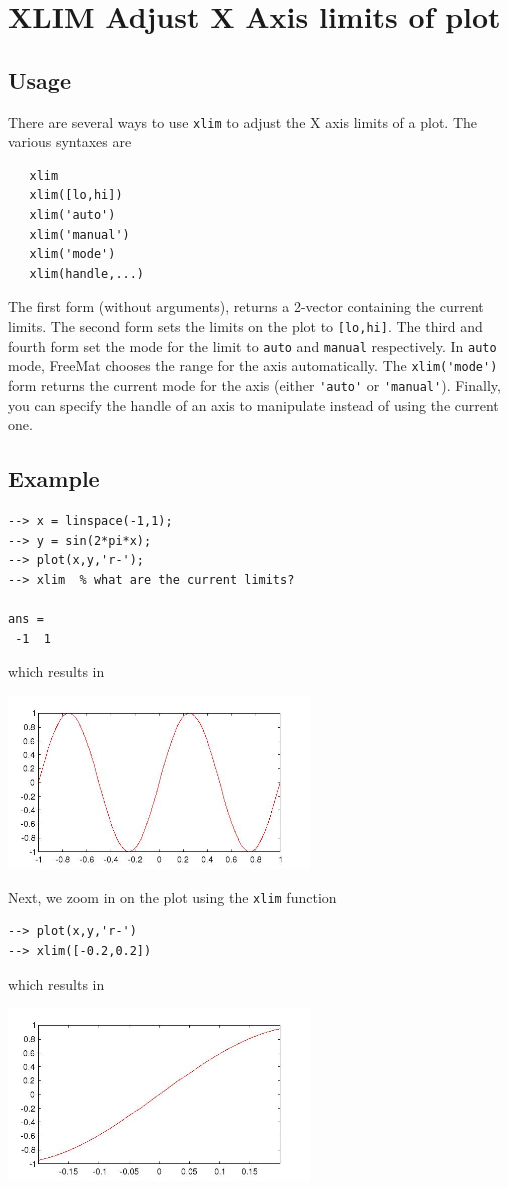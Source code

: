 \section{XLIM Adjust X Axis limits of plot}

\subsection{Usage}

There are several ways to use \verb|xlim| to adjust the X axis limits of
a plot.  The various syntaxes are
\begin{verbatim}
   xlim
   xlim([lo,hi])   
   xlim('auto')
   xlim('manual')
   xlim('mode')
   xlim(handle,...)
\end{verbatim}
The first form (without arguments), returns a 2-vector containing the
current limits.  The second form sets the limits on the plot to \verb|[lo,hi]|.
The third and fourth form set the mode for the limit to \verb|auto| and \verb|manual|
respectively.  In \verb|auto| mode, FreeMat chooses the range for the axis 
automatically.  The \verb|xlim('mode')| form returns the current mode for the axis
(either \verb|'auto'| or \verb|'manual'|).  Finally, you can specify the handle of an
axis to manipulate instead of using the current one.
\subsection{Example}

\begin{verbatim}
--> x = linspace(-1,1);
--> y = sin(2*pi*x);
--> plot(x,y,'r-');
--> xlim  % what are the current limits?

ans = 
 -1  1 
\end{verbatim}
which results in


\centerline{\includegraphics[width=8cm]{xlim1}}

Next, we zoom in on the plot using the \verb|xlim| function
\begin{verbatim}
--> plot(x,y,'r-')
--> xlim([-0.2,0.2])
\end{verbatim}
which results in


\centerline{\includegraphics[width=8cm]{xlim2}}

